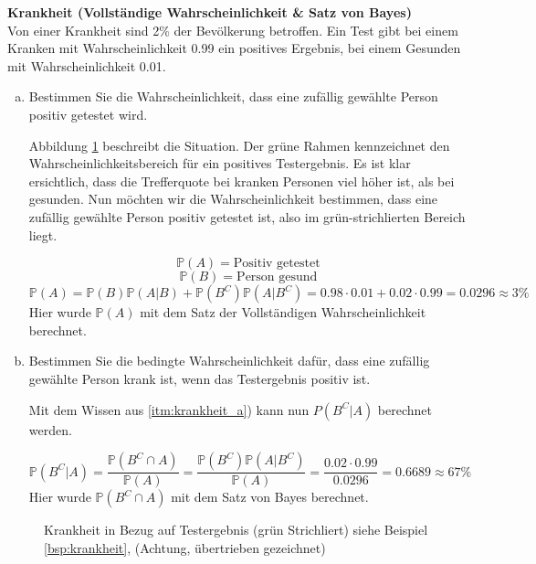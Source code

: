 {    \begin{bsp}\label{bsp:krankheit} \textbf{Krankheit (Vollständige Wahrscheinlichkeit \& Satz von Bayes)}\\

    Von einer Krankheit sind 2\% der Bevölkerung betroffen. Ein Test gibt
    bei einem Kranken mit Wahrscheinlichkeit 0.99 ein positives Ergebnis,
    bei einem Gesunden mit Wahrscheinlichkeit 0.01.

    \begin{enumerate}[a)]
        \item \label{itm:krankheit_a}Bestimmen Sie die Wahrscheinlichkeit, dass eine zufällig gewählte
            Person positiv getestet wird.

            Abbildung \ref{fig:krankheit} beschreibt die Situation. Der grüne Rahmen kennzeichnet den
            Wahrscheinlichkeitsbereich für ein positives Testergebnis. Es ist klar
            ersichtlich, dass die Trefferquote bei kranken Personen viel höher ist,
            als bei gesunden. Nun möchten wir die Wahrscheinlichkeit bestimmen,
            dass eine zufällig gewählte Person positiv getestet ist, also im
            grün-strichlierten Bereich liegt.

            \[\mathbb P\left(A\right)=\text{Positiv getestet}\]
            \[\mathbb P\left(B\right)=\text{Person gesund}\]
            \[\mathbb P\left(A\right)=\mathbb P\left(B\right)\mathbb P\left(A|B\right)+\mathbb P\left(B^{C}\right)\mathbb P\left(A|B^{C}\right) = 0.98\cdot 0.01+0.02\cdot 0.99=0.0296\approx 3\%\]
            Hier wurde $\mathbb P(A)$ mit dem Satz der Vollständigen Wahrscheinlichkeit berechnet. 
        \item Bestimmen Sie die bedingte Wahrscheinlichkeit dafür, dass eine
            zufällig gewählte Person krank ist, wenn das Testergebnis positiv ist.

            Mit dem Wissen aus \ref{itm:krankheit_a}) kann nun  $P(B^{C}|A)$ berechnet werden.

            \[
                \mathbb P(B^{C}|A)=\frac{\mathbb P(B^{C}\cap A)}{\mathbb P\left(A\right)}=
                \frac{\mathbb P\left(B^{C}\right)\mathbb P(A|B^{C})}{\mathbb P(A)}=\frac{0.02\cdot 0.99}{0.0296}=0.6689\approx 67\%
            \]
            Hier wurde $\mathbb P\left(B^{C}\cap A\right)$ mit dem Satz von Bayes berechnet.
        \end{enumerate}
    \end{bsp}

    \begin{figure}
    \centering
        \begin{tikzpicture}
            
        \end{tikzpicture}
        \caption{Krankheit in Bezug auf Testergebnis (grün Strichliert) siehe Beispiel \ref{bsp:krankheit}, (Achtung, übertrieben gezeichnet)}
        \label{fig:krankheit}
    \end{figure}


}
